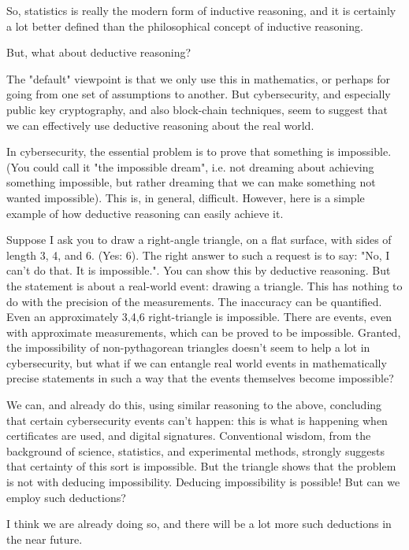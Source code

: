 \documentclass[journal]{IEEEtran}
\begin{document}
So, statistics is really the modern form of inductive reasoning, and
it is certainly a lot better defined than the philosophical concept of
inductive reasoning.

But, what about deductive reasoning?

The "default" viewpoint is that we only use this in mathematics,
or perhaps for going from one set of assumptions to another. But
cybersecurity, and especially public key cryptography, and also
block-chain techniques, seem to suggest that we can effectively use
deductive reasoning about the real world.

In cybersecurity, the essential problem is to prove that something is
impossible. (You could call it "the impossible dream", i.e. not dreaming
about achieving something impossible, but rather dreaming that we can make
something not wanted impossible). This is, in general, difficult. However,
here is a simple example of how deductive reasoning can easily achieve it.

Suppose I ask you to draw a right-angle triangle, on a flat surface, with
sides of length 3, 4, and 6. (Yes: 6). The right answer to such a request
is to say: "No, I can't do that. It is impossible.". You can show this
by deductive reasoning. But the statement is about a real-world event:
drawing a triangle. This has nothing to do with the precision of the
measurements. The inaccuracy can be quantified. Even an approximately
3,4,6 right-triangle is impossible. There are events, even with
approximate measurements, which can be proved to be impossible. Granted,
the impossibility of non-pythagorean triangles doesn't seem to help a
lot in cybersecurity, but what if we can entangle real world events in
mathematically precise statements in such a way that the events themselves
become impossible?

We can, and already do this, using similar reasoning to the above,
concluding that certain cybersecurity events can't happen: this
is what is happening when certificates are used, and digital
signatures. Conventional wisdom, from the background of science,
statistics, and experimental methods, strongly suggests that certainty
of this sort is impossible. But the triangle shows that the problem is
not with deducing impossibility. Deducing impossibility is possible! But
can we employ such deductions?

I think we are already doing so, and there will be a lot more such deductions in the near future.
\end{document}
